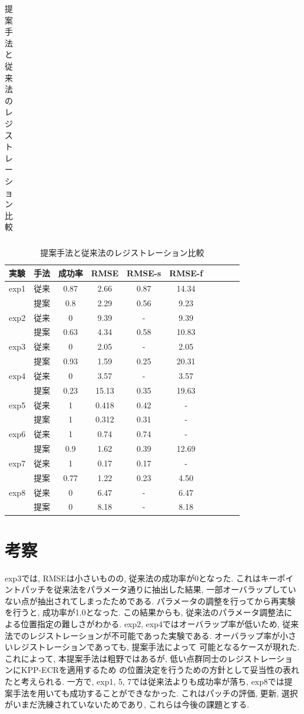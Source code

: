 \documentclass[twocolumn, 9pt, a4j, dvipdfmx]{jsarticle}
\begin{document}
\begin{table}[H]
\begin{center}
\begin{tabular}{c ccc}
    \end{tabular}
    \end{center}
    \footnotesize 
    \caption{提案手法と従来法のレジストレーション比較\label{Dynamic-result}}
    \begin{center}
    \begin{tabular}{l  c  c  c  c  c c c c c}\hline
実験 &  手法 & 成功率 &  RMSE & RMSE-s & RMSE-f \\ 
\hline \hline
    exp1 & 従来 & 0.87   & 2.66  & 0.87 & 14.34 \\
         & 提案 & 0.8    & 2.29  & 0.56 & 9.23 \\
    \hline
    exp2 & 従来 &   0    & 9.39  & -    & 9.39 \\
         & 提案 & 0.63   & 4.34  & 0.58 & 10.83\\
    \hline
    exp3 & 従来 &   0    & 2.05  & -    & 2.05 \\
         & 提案 & 0.93   & 1.59  & 0.25 & 20.31\\
    \hline
    exp4 & 従来 &   0    & 3.57  & -    & 3.57 \\
         & 提案 & 0.23   & 15.13 & 0.35 & 19.63\\
    \hline
    exp5 & 従来 &   1    & 0.418 & 0.42 & -    \\
         & 提案 &   1    & 0.312 & 0.31 & -    \\
    \hline
    exp6 & 従来 &   1    & 0.74  & 0.74  & -    \\
         & 提案 & 0.9    & 1.62  & 0.39  & 12.69\\
    \hline
    exp7 & 従来 &   1    & 0.17  & 0.17 &  -     \\
         & 提案 & 0.77   & 1.22  & 0.23 &  4.50 \\
    \hline
    exp8 & 従来 &   0    & 6.47  & -    &  6.47 \\
         & 提案 &   0    & 8.18  & -    &  8.18 \\
    \hline
    \end{tabular}
    \end{center} 
\end{table}      

\section{考察}
exp3では, RMSEは小さいものの, 従来法の成功率が0となった. 
これはキーポイントパッチを従来法をパラメータ通りに抽出した結果, 
一部オーバラップしていない点が抽出されてしまったためである.  
パラメータの調整を行ってから再実験を行うと, 成功率が1.0となった. 
この結果からも, 従来法のパラメータ調整法による位置指定の難しさがわかる. 
exp2, exp4ではオーバラップ率が低いため, 
従来法でのレジストレーションが不可能であった実験である.
オーバラップ率が小さいレジストレーションであっても, 提案手法によって
可能となるケースが現れた. 
これによって, 本提案手法は粗野ではあるが, 
低い点群同士のレジストレーションにKPP-ECRを適用するため
の位置決定を行うための方針として妥当性の表れたと考えられる. 
一方で, exp1, 5, 7では従来法よりも成功率が落ち, 
exp8では提案手法を用いても成功することができなかった. 
これはパッチの評価, 更新, 選択がいまだ洗練されていないためであり, 
これらは今後の課題とする. 
\end{document}
